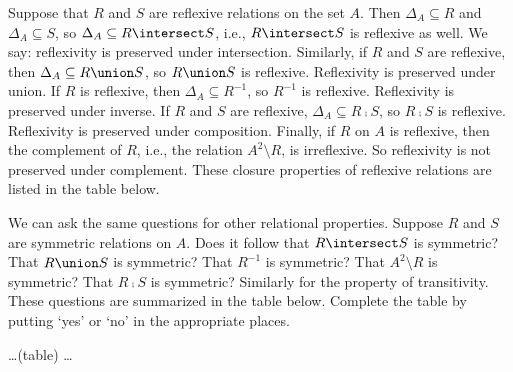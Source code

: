 \documentclass{report}
\begin{document}
\begin{Exercise} [number=50]
  Suppose that $R$ and $S$ are reflexive relations on the set
  $A$. Then $\Delta_A \subseteq R$ and $\Delta_A \subseteq S$, so
  $\Delta_A \subseteq R \intersect S$, i.e., $R \intersect S$ is
  reflexive as well. We say: reflexivity is preserved under
  intersection. Similarly, if $R$ and $S$ are reflexive, then
  $\Delta_A \subseteq R \union S$, so $R \union S$ is
  reflexive. Reflexivity is preserved under union. If $R$ is
  reflexive, then $\Delta_A \subseteq R^{-1}$, so $R^{-1}$ is
  reflexive. Reflexivity is preserved under inverse. If $R$ and $S$
  are reflexive, $\Delta_A \subseteq R \comp S$, so $R \comp S$ is
  reflexive. Reflexivity is preserved under composition. Finally, if
  $R$ on $A$ is reflexive, then the complement of $R$, i.e., the
  relation $A^2 \setminus R$, is irreflexive. So reflexivity is not
  preserved under complement. These closure properties of reflexive
  relations are listed in the table below.

  We can ask the same questions for other relational
  properties. Suppose $R$ and $S$ are symmetric relations on $A$. Does
  it follow that $R \intersect S$ is symmetric? That $R \union S$ is
  symmetric? That $R^{-1}$ is symmetric? That $A^2 \setminus R$ is
  symmetric? That $R \comp S$ is symmetric? Similarly for the property
  of transitivity. These questions are summarized in the table
  below. Complete the table by putting `yes' or `no' in the
  appropriate places.

  \dots (table) \dots
\end{Exercise}

\end{document}
